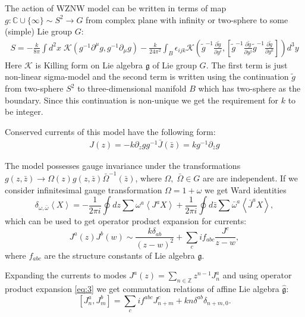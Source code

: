 \documentclass[a4paper]{jpconf}
\theoremstyle{definition}
\newcommand{\gf}{\mathfrak{g}}
\newcommand{\gfh}{\hat{\mathfrak{g}}}
\theoremstyle{definition} \newtheorem{Def}{Definition}
\begin{document}
 The action of WZNW model can be written in terms of map $g:\mathbb{C}\cup \{\infty\}\sim S^{2}\to G$ from complex plane with infinity or two-sphere to some (simple) Lie group $G$:
\begin{multline}
  S=-\frac{k}{8\pi}\int d^2x\; \mathcal{K} (g^{-1}\partial^{\mu}g, g^{-1} \partial_{\mu}g)  
  - \frac{k }{24\pi^{2}} \int_{B}\epsilon_{ijk} \mathcal{K}\left(
    \tilde g^{-1}\frac{\partial \tilde g}{\partial y^i},\left[
      \tilde g^{-1}\frac{\partial \tilde g}{\partial y^j}
      \tilde g^{-1}\frac{\partial \tilde g}{\partial y^k}\right]\right) d^3y
\end{multline}
 Here $\mathcal{K}$ is Killing form on Lie algebra $\gf$ of Lie group $G$. The first term is just non-linear sigma-model and the second term is written using the continuation $\tilde{g}$ from two-sphere $S^{2}$ to three-dimensional manifold $B$ which has two-sphere as the boundary. Since this continuation is non-unique we get the requirement for $k$ to be integer. 

Conserved currents of this model have the following form:
  \begin{eqnarray}
    J(z)= -k \partial_zg g^{-1}
    \bar J(\bar z)=k g^{-1}\partial_{\bar z}g
  \end{eqnarray}

The model possesses gauge invariance under the transformations
  $g(z,\bar z)\to \Omega(z)g(z,\bar z)\bar \Omega^{-1}(\bar z)$, 
where $\Omega,\;\bar \Omega \in G$ are are independent. If we consider infinitesimal gauge transformation $\Omega=1+\omega$ we get Ward identities 
  \begin{equation}
    \label{eq:87}
    \delta_{\omega,\bar \omega}\left< X \right>=-\frac{1}{2\pi i}\oint dz \sum\omega^a \left< J^a X\right>+
    \frac{1}{2\pi i} \oint d\bar z \sum \bar \omega^a \left< \bar J^a X\right>,
  \end{equation}
which can be used to get operator product expansion for currents:
 \begin{equation}
   \label{eq:3}
   J^{a}(z)J^{b}(w)\sim \frac{k\delta_{ab}}{(z-w)^{2}}+\sum_{c}i f_{abc}\frac{J^{c}}{z-w},
 \end{equation}
where $f_{abc}$ are the structure constants of Lie algebra $\gf$.
 
Expanding the currents to modes
$J^a(z)=\sum\limits_{n\in \mathbb Z}z^{n-1}J^a_n $
and using operator product expansion \eqref{eq:3} we get commutation relations of affine Lie algebra $\gfh$:
\begin{equation*}
 \left[J^a_n,J^b_m\right]=\sum_c i f^{abc}J^c_{n+m}+kn\delta^{ab}\delta_{n+m,0}.  
\end{equation*}
\end{document}
